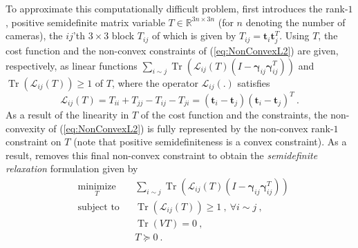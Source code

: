 \documentclass[10pt]{article}
\newcommand{\R}{\ensuremath{\mathbb{R}}}
\newcommand{\tr}{\mathop{\mathrm{Tr}}\nolimits}
\begin{document}
To approximate this computationally difficult problem, \cite{CvXSfM} first introduces the rank-$1$, positive semidefinite matrix variable $T\in\R^{3n\times3n}$ (for $n$ denoting the number of cameras), the $ij$'th $3\times3$ block $T_{ij}$ of which is given by $T_{ij} = \mathbf{t}_i\mathbf{t}_j^T$. Using $T$, the cost function and the non-convex constraints of (\ref{eq:NonConvexL2}) are given, respectively, as linear functions $\sum_{i\sim j} \tr\left(\mathcal{L}_{ij}(T)\left(I-\mathbf{\gamma}_{ij}\mathbf{\gamma}_{ij}^T\right)\right)$ and $\tr\left(\mathcal{L}_{ij}(T)\right)\geq 1$ of $T$, where the operator $\mathcal{L}_{ij}(.)$ satisfies
\begin{equation}
\label{eq:LijT} 
\mathcal{L}_{ij}(T) = T_{ii} + T_{jj} - T_{ij} - T_{ji} = \left(\mathbf{t}_i - \mathbf{t}_j\right)\left(\mathbf{t}_i - \mathbf{t}_j\right)^T \ .
\end{equation}
As a result of the linearity in $T$ of the cost function and the constraints, the non-convexity of (\ref{eq:NonConvexL2}) is fully represented by the non-convex rank-$1$ constraint on $T$ (note that positive semidefiniteness is a convex constraint). As a result, \cite{CvXSfM} removes this final non-convex constraint to obtain the \textit{semidefinite relaxation} formulation given by
\begin{equation}
\label{eq:SDR}
\begin{aligned}
& \underset{{\scriptstyle T}}{\text{minimize}}
& & \sum_{i\sim j} \tr\left(\mathcal{L}_{ij}(T)\left(I-\mathbf{\gamma}_{ij}\mathbf{\gamma}_{ij}^T\right)\right)\\
& \text{subject to} 
& & \tr\left(\mathcal{L}_{ij}(T)\right)\geq 1\ , \ \forall i\sim j \ ,\\
& & & \tr\left(VT\right) = 0 \ , \\
& & & T \succeq 0 \ .
\end{aligned}
\end{equation}
\end{document}
